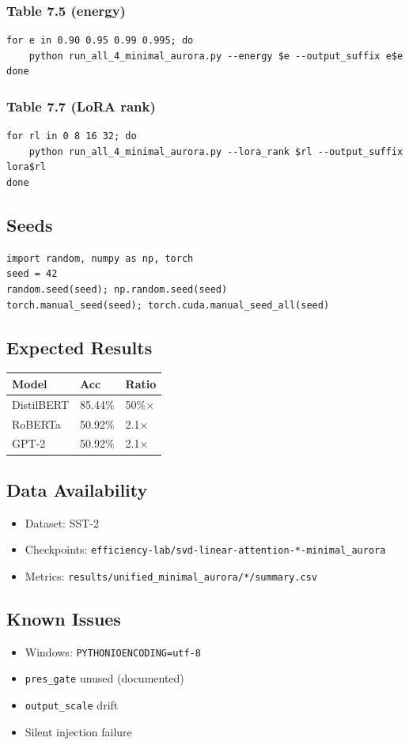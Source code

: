 \subsubsection{Table 7.5 (energy)}
\begin{lstlisting}
for e in 0.90 0.95 0.99 0.995; do
    python run_all_4_minimal_aurora.py --energy $e --output_suffix e$e
done
\end{lstlisting}

\subsubsection{Table 7.7 (LoRA rank)}
\begin{lstlisting}
for rl in 0 8 16 32; do
    python run_all_4_minimal_aurora.py --lora_rank $rl --output_suffix lora$rl
done
\end{lstlisting}

\subsection{Seeds}

\begin{lstlisting}
import random, numpy as np, torch
seed = 42
random.seed(seed); np.random.seed(seed)
torch.manual_seed(seed); torch.cuda.manual_seed_all(seed)
\end{lstlisting}

\subsection{Expected Results}

\begin{table}[H]
\centering
\small
\begin{tabular}{lll}
\toprule
\textbf{Model} & \textbf{Acc} & \textbf{Ratio} \\
\midrule
DistilBERT & 85.44\% & 50\%$\times$ \\
RoBERTa & 50.92\% & 2.1$\times$ \\
GPT-2 & 50.92\% & 2.1$\times$ \\
\bottomrule
\end{tabular}
\end{table}

\subsection{Data Availability}

\begin{itemize}
\item Dataset: SST-2
\item Checkpoints: \texttt{efficiency-lab/svd-linear-attention-*-minimal\_aurora}
\item Metrics: \texttt{results/unified\_minimal\_aurora/*/summary.csv}

\end{itemize}
\subsection{Known Issues}

\begin{itemize}
\item Windows: \texttt{PYTHONIOENCODING=utf-8}
\item \texttt{pres\_gate} unused (documented)
\item \texttt{output\_scale} drift
\item Silent injection failure

\end{itemize}
